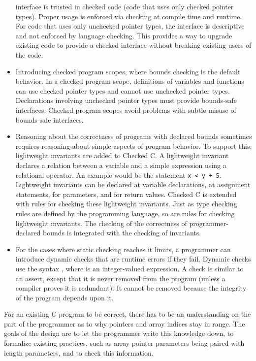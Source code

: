 \begin{itemize}
  interface is trusted in checked code (code that uses only checked pointer types).
  Proper usage is enforced via checking at compile time and runtime. For
  code that uses only unchecked pointer types, the interface is descriptive and
  not enforced by
  language checking. This provides a way to upgrade existing code to
  provide a checked interface without breaking existing users of the code.
\item
  Introducing checked program scopes, where bounds checking is the
  default behavior. In a checked program scope, definitions of variables
  and functions can use checked pointer types and cannot use unchecked pointer
  types. Declarations involving unchecked pointer types must provide
  bounds-safe interfaces. Checked program scopes avoid problems with
  subtle misuse of bounds-safe interfaces.
\item
  Reasoning about the correctness of programs with declared bounds
  sometimes requires reasoning about simple aspects of program behavior.
  To support this, lightweight invariants are added to Checked C. A lightweight
  invariant declares a relation between a variable and a simple
  expression using a relational operator. An example would be the
  statement \texttt{x < y + 5}. Lightweight invariants can be
  declared at variable declarations, at assignment statements, for
  parameters, and for return values. Checked C is extended with rules for
  checking these lightweight invariants. Just as type checking rules are
  defined by the programming language, so are rules for checking
  lightweight invariants. The checking of the correctness of
  programmer-declared bounds is integrated with the checking of
  invariants.
\item
  For the cases where static checking reaches it limits, a programmer
  can introduce dynamic checks that are runtime errors if they fail.
  Dynamic checks use the syntax  , where  is an
  integer-valued expression. A check is similar to an assert, except
  that it is never removed from the program (unless a compiler proves
  it is redundant). It cannot be removed because the integrity of the
  program depends upon it.
\end{itemize}

For an existing C program to be correct, there has to be an
understanding on the part of the programmer as to why pointers and array
indices stay in range. The goals of the design are to let the programmer
write this knowledge down, to formalize existing practices, such as
array pointer parameters being paired with length parameters, and to
check this information.

